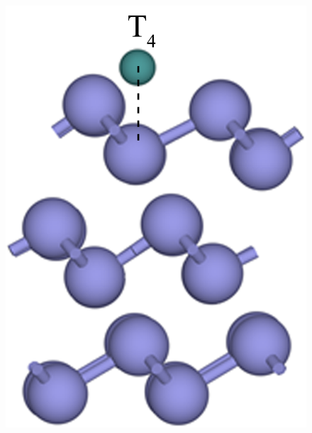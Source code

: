 \begin{figure}[htb]
{        \includegraphics[trim={0, -20, 0 0},clip]{pic/IS_structure_T4onBi.png}
    }
    \subfloat[]{
        \label{fig:IS_structure_H3onBi}
}
\end{figure}
